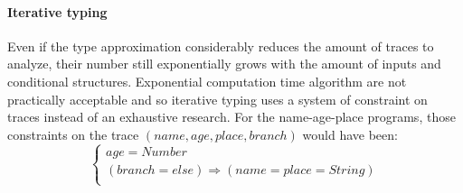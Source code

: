 \documentclass[a4paper]{report}
\begin{document}
\paragraph{Iterative typing} Even if the type approximation considerably reduces the amount of traces to analyze, their number still exponentially grows with the amount of inputs and conditional structures. Exponential computation time algorithm are not practically acceptable and so iterative typing uses a system of constraint on traces instead of an exhaustive research. For the name-age-place programs, those constraints on the trace $(name,age,place,branch)$ would have been:
$$\left\{\begin{array}{l}
age = Number\\
(branch = else)\Rightarrow (name = place = String)\\
\end{array}\right.$$
\end{document}
